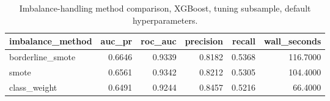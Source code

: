 \begin{table}
\caption{Imbalance-handling method comparison, XGBoost, tuning subsample, default hyperparameters.}
\label{tab:table15_imbalance_method_comparison}
\begin{tabular}{lrrrrr}
\toprule
imbalance\_method & auc\_pr & roc\_auc & precision & recall & wall\_seconds \\
\midrule
borderline\_smote & 0.6646 & 0.9339 & 0.8182 & 0.5368 & 116.7000 \\
smote & 0.6561 & 0.9342 & 0.8212 & 0.5305 & 104.4000 \\
class\_weight & 0.6491 & 0.9244 & 0.8457 & 0.5216 & 66.4000 \\
\bottomrule
\end{tabular}
\end{table}
